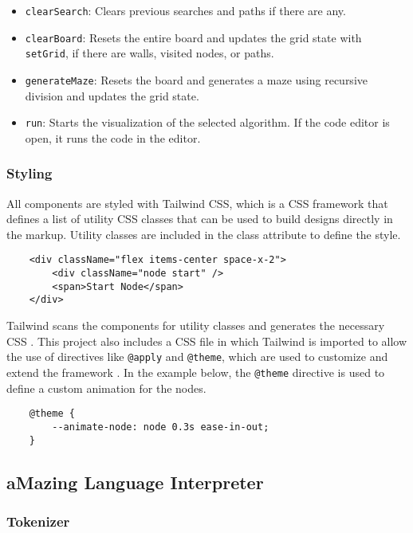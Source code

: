 \begin{itemize}
    \item \texttt{clearSearch}: Clears previous searches and paths if there are any.
    \item \texttt{clearBoard}: Resets the entire board and updates the grid state with \texttt{setGrid}, if there are walls, visited nodes, or paths.
    \item \texttt{generateMaze}: Resets the board and generates a maze using recursive division and updates the grid state.
    \item \texttt{run}: Starts the visualization of the selected algorithm. If the code editor is open, it runs the code in the editor.
\end{itemize}

\subsubsection{Styling}
All components are styled with Tailwind CSS, which is a CSS framework that defines a list of utility CSS classes that can be used to build designs directly in the markup. Utility classes are included in the class attribute to define the style.

\begin{verbatim}
    <div className="flex items-center space-x-2">
        <div className="node start" />
        <span>Start Node</span>
    </div>
\end{verbatim}

Tailwind scans the components for utility classes and generates the necessary CSS \cite{tailwind-utility}. This project also includes a CSS file in which Tailwind is imported to allow the use of directives like \texttt{@apply} and \texttt{@theme}, which are used to customize and extend the framework \cite{tailwind-directives}. In the example below, the \texttt{@theme} directive is used to define a custom animation for the nodes.

\begin{verbatim}
    @theme {
        --animate-node: node 0.3s ease-in-out;
    }
\end{verbatim}

\subsection{aMazing Language Interpreter}

\subsubsection{Tokenizer}


